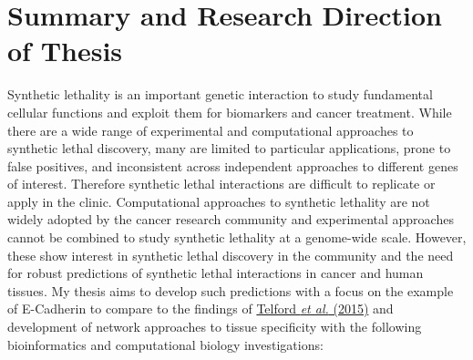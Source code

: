 





\section{Summary and Research Direction of Thesis}


Synthetic lethality is an important genetic interaction to study fundamental cellular functions and exploit them for biomarkers and cancer treatment. While there are a wide range of experimental and computational approaches to synthetic lethal discovery, many are limited to particular applications, prone to false positives, and inconsistent across independent approaches to different genes of interest. Therefore synthetic lethal interactions are difficult to replicate or apply in the clinic. Computational approaches to synthetic lethality are not widely adopted by the cancer research community and experimental approaches cannot be combined to study synthetic lethality at a genome-wide scale. However, these show interest in synthetic lethal discovery in the community and the need for robust predictions of synthetic lethal interactions in cancer and human tissues. My thesis aims to develop such predictions with a focus on the example of E-Cadherin to compare to the findings of \hyperlink{ENREF94}{Telford}\hyperlink{ENREF94}{\textit{ et al.}}\hyperlink{ENREF94}{ (2015)} and development of network approaches to tissue specificity with the following bioinformatics and computational biology investigations:

